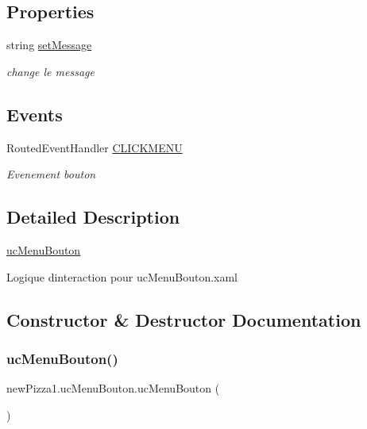 \subsection*{Properties}
\begin{DoxyCompactItemize}
\item 
string \hyperlink{classnewPizza1_1_1ucMenuBouton_ac3b1d4595f7f898a96f4ff255c16b1ae}{set\+Message}
\begin{DoxyCompactList}\small\item\em change le message \end{DoxyCompactList}\end{DoxyCompactItemize}
\subsection*{Events}
\begin{DoxyCompactItemize}
\item 
Routed\+Event\+Handler \hyperlink{classnewPizza1_1_1ucMenuBouton_a2f8676c103816d8ba83b0536d1f27195}{C\+L\+I\+C\+K\+M\+E\+NU}
\begin{DoxyCompactList}\small\item\em Evenement bouton \end{DoxyCompactList}\end{DoxyCompactItemize}


\subsection{Detailed Description}
\hyperlink{classnewPizza1_1_1ucMenuBouton}{uc\+Menu\+Bouton} 

Logique d\textquotesingle{}interaction pour uc\+Menu\+Bouton.\+xaml 

\subsection{Constructor \& Destructor Documentation}
\mbox{\label{classnewPizza1_1_1ucMenuBouton_a46685780f4b18a0406adfaa218a7351c}} 
\subsubsection{\texorpdfstring{uc\+Menu\+Bouton()}{ucMenuBouton()}}
{\footnotesize\ttfamily new\+Pizza1.\+uc\+Menu\+Bouton.\+uc\+Menu\+Bouton (\begin{DoxyParamCaption}{ }\end{DoxyParamCaption})\hspace{0.3cm}{\ttfamily [inline]}}



